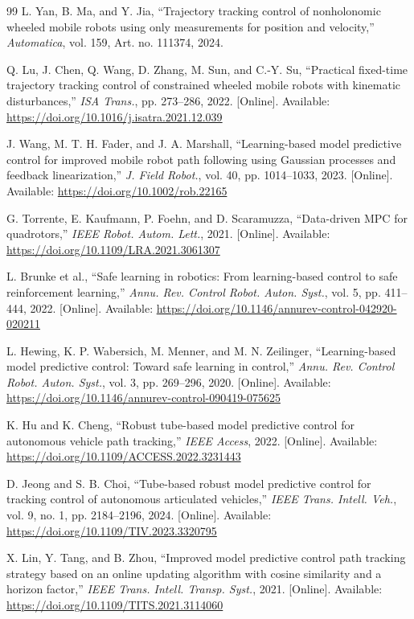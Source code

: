 \begin{thebibliography}{99}
L. Yan, B. Ma, and Y. Jia, ``Trajectory tracking control of nonholonomic wheeled mobile robots using only measurements for position and velocity,'' \emph{Automatica}, vol. 159, Art. no. 111374, 2024.

Q. Lu, J. Chen, Q. Wang, D. Zhang, M. Sun, and C.-Y. Su, ``Practical fixed-time trajectory tracking control of constrained wheeled mobile robots with kinematic disturbances,'' \emph{ISA Trans.}, pp. 273--286, 2022. [Online]. Available: \url{https://doi.org/10.1016/j.isatra.2021.12.039}

J. Wang, M. T. H. Fader, and J. A. Marshall, ``Learning-based model predictive control for improved mobile robot path following using Gaussian processes and feedback linearization,'' \emph{J. Field Robot.}, vol. 40, pp. 1014--1033, 2023. [Online]. Available: \url{https://doi.org/10.1002/rob.22165}

G. Torrente, E. Kaufmann, P. Foehn, and D. Scaramuzza, ``Data-driven MPC for quadrotors,'' \emph{IEEE Robot. Autom. Lett.}, 2021. [Online]. Available: \url{https://doi.org/10.1109/LRA.2021.3061307}

L. Brunke et al., ``Safe learning in robotics: From learning-based control to safe reinforcement learning,'' \emph{Annu. Rev. Control Robot. Auton. Syst.}, vol. 5, pp. 411--444, 2022. [Online]. Available: \url{https://doi.org/10.1146/annurev-control-042920-020211}

L. Hewing, K. P. Wabersich, M. Menner, and M. N. Zeilinger, ``Learning-based model predictive control: Toward safe learning in control,'' \emph{Annu. Rev. Control Robot. Auton. Syst.}, vol. 3, pp. 269--296, 2020. [Online]. Available: \url{https://doi.org/10.1146/annurev-control-090419-075625}

K. Hu and K. Cheng, ``Robust tube-based model predictive control for autonomous vehicle path tracking,'' \emph{IEEE Access}, 2022. [Online]. Available: \url{https://doi.org/10.1109/ACCESS.2022.3231443}

D. Jeong and S. B. Choi, ``Tube-based robust model predictive control for tracking control of autonomous articulated vehicles,'' \emph{IEEE Trans. Intell. Veh.}, vol. 9, no. 1, pp. 2184--2196, 2024. [Online]. Available: \url{https://doi.org/10.1109/TIV.2023.3320795}

X. Lin, Y. Tang, and B. Zhou, ``Improved model predictive control path tracking strategy based on an online updating algorithm with cosine similarity and a horizon factor,'' \emph{IEEE Trans. Intell. Transp. Syst.}, 2021. [Online]. Available: \url{https://doi.org/10.1109/TITS.2021.3114060}


\end{thebibliography}
